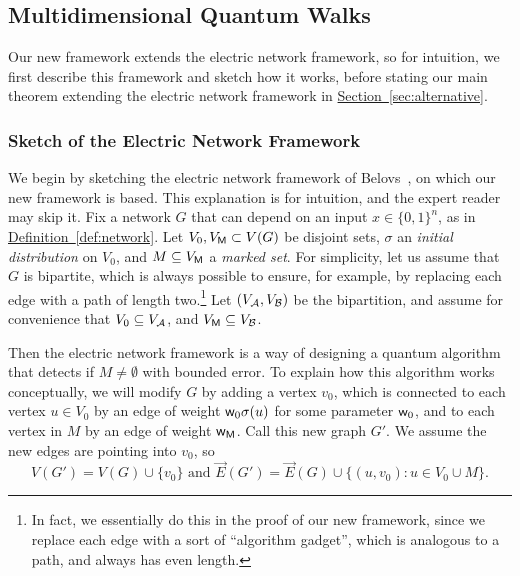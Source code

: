 \documentclass{theoretics}
\renewcommand{\sec}[1]{\hyperref[sec:#1]{Section~\ref*{sec:#1}}}
\newcommand{\defin}[1]{\hyperref[def:#1]{Definition~\ref*{def:#1}}}
\renewcommand{\>}{\rangle}
\newcommand{\<}{\langle}
\renewcommand{\(}{\left(}
\renewcommand{\)}{\right)}
\def\w{{\sf w}}
\begin{document}
\subsection{Multidimensional Quantum Walks}\label{sec:full-framework}

Our new framework extends the electric network framework, so for intuition, we first describe this framework and sketch how it works, before stating our main theorem extending the electric network framework in \sec{alternative}.

\subsubsection{Sketch of the Electric Network Framework}\label{sec:sketch}

We begin by sketching the electric network framework of Belovs~\cite{belovs2013ElectricWalks}, on which our new framework is based. This explanation is for intuition, and the expert reader may skip it. 
Fix a network $G$ that can depend on an input $x\in\{0,1\}^n$, as in \defin{network}. Let $V_0,V_{\sf M}\subset V(G)$ be disjoint sets, $\sigma$ an \emph{initial distribution} on $V_0$, and $M\subseteq V_{\sf M}$ a \emph{marked set}. For simplicity, let us assume that $G$ is bipartite, which is always possible to ensure, for example, by replacing each edge with a path of length two.\footnote{In fact, we essentially do this in the proof of our new framework, since we replace each edge with a sort of ``algorithm gadget'', which is analogous to a path, and always has even length.}  Let $(V_{\cal A},V_{\cal B})$ be the bipartition, and assume for convenience that $V_0\subseteq V_{\cal A}$, and $V_{\sf M}\subseteq V_{\cal B}$.

Then the electric network framework is a way of designing a quantum algorithm that detects if $M\neq \emptyset$ with bounded error. 
To explain how this algorithm works conceptually, we will modify $G$ by adding a vertex $v_0$, which is connected to each vertex $u\in V_0$ by an edge of weight $\w_0\sigma(u)$ for some parameter $\w_0$, and to each vertex in $M$ by an edge of weight $\w_{\sf M}$.
Call this new graph $G'$. We assume the new edges are pointing into $v_0$, so 
$$V(G')=V(G)\cup\{v_0\}
\mbox{ and }
\overrightarrow{E}(G')=\overrightarrow{E}(G)\cup\{(u,v_0):u\in V_0\cup M\}.$$
\end{document}
